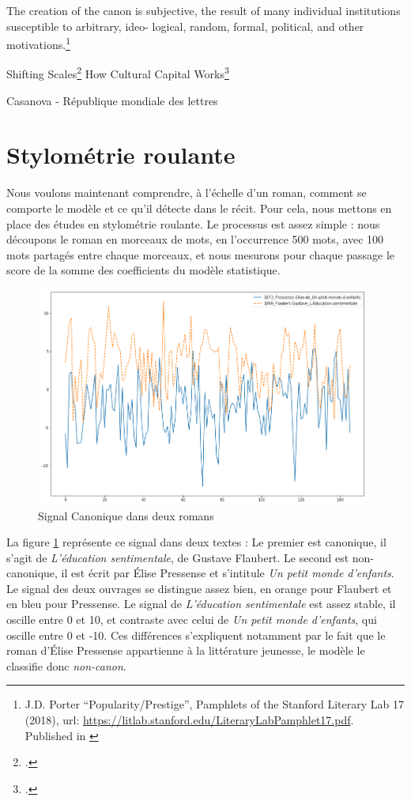 The creation of the canon is subjective, the result of many individual institutions susceptible to arbitrary, ideo-
logical, random, formal, political, and other motivations.\footnote{J.D. Porter \enquote{Popularity/Prestige}, Pamphlets of the Stanford Literary Lab 17 (2018), url: \url{https://litlab.stanford.edu/LiteraryLabPamphlet17.pdf}. Published in \cite{moretti_canonarchive_2017}}

Shifting Scales\footcites{english_shifting_2016}
How Cultural Capital Works\footcites{piper_how_2016}

Casanova - République mondiale des lettres



\newpage
\section{Stylométrie roulante}

Nous voulons maintenant comprendre, à l'échelle d'un roman, comment se comporte le modèle et ce qu'il détecte dans le récit. Pour cela, nous mettons en place des études en stylométrie roulante. Le processus est assez simple : nous découpons le roman en morceaux de mots, en l'occurrence 500 mots, avec 100 mots partagés entre chaque morceaux, et nous mesurons pour chaque passage le score de la somme des coefficients du modèle statistique. 

\bigskip
\begin{figure}[!ht]
    \centering
    \includegraphics[width=11cm]{img/18_flaubert_signal.png}
    \caption{Signal Canonique dans deux romans}
    \label{signal}
\end{figure}

La figure \ref{signal} représente ce signal dans deux textes : Le premier est canonique, il s'agit de \textit{L'éducation sentimentale}, de Gustave Flaubert. Le second est non-canonique, il est écrit par Élise Pressense et s'intitule \textit{Un petit monde d'enfants}. Le signal des deux ouvrages se distingue assez bien, en orange pour Flaubert et en bleu pour Pressense. Le signal de \textit{L'éducation sentimentale} est assez stable, il oscille entre 0 et 10, et contraste avec celui de \textit{Un petit monde d'enfants}, qui oscille entre 0 et -10. Ces différences s'expliquent notamment par le fait que le roman d'Élise Pressense appartienne à la littérature jeunesse, le modèle le classifie donc \textit{non-canon}. 

